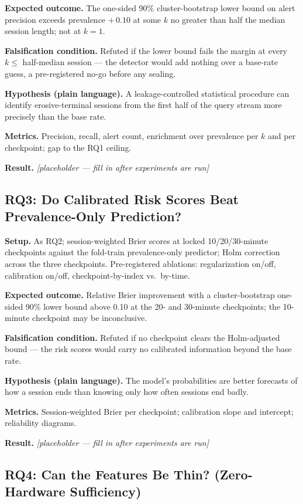\documentclass[11pt]{article}
\begin{document}
\textbf{Expected outcome.} The one-sided 90\% cluster-bootstrap lower bound on alert precision exceeds prevalence $+\,0.10$ at some $k$ no greater than half the median session length; not at $k = 1$.

\textbf{Falsification condition.} Refuted if the lower bound fails the margin at every $k \leq$ half-median session --- the detector would add nothing over a base-rate guess, a pre-registered no-go before any sealing.

\textbf{Hypothesis (plain language).} A leakage-controlled statistical procedure can identify erosive-terminal sessions from the first half of the query stream more precisely than the base rate.

\textbf{Metrics.} Precision, recall, alert count, enrichment over prevalence per $k$ and per checkpoint; gap to the RQ1 ceiling.

\textbf{Result.} \emph{[placeholder --- fill in after experiments are run]}

\subsection{RQ3: Do Calibrated Risk Scores Beat Prevalence-Only Prediction?}

\textbf{Setup.} As RQ2; session-weighted Brier scores at locked 10/20/30-minute checkpoints against the fold-train prevalence-only predictor; Holm correction \citep{holm1979simple} across the three checkpoints. Pre-registered ablations: regularization on/off, calibration on/off, checkpoint-by-index vs.\ by-time.

\textbf{Expected outcome.} Relative Brier improvement with a cluster-bootstrap one-sided 90\% lower bound above 0.10 at the 20- and 30-minute checkpoints; the 10-minute checkpoint may be inconclusive.

\textbf{Falsification condition.} Refuted if no checkpoint clears the Holm-adjusted bound --- the risk scores would carry no calibrated information beyond the base rate.

\textbf{Hypothesis (plain language).} The model's probabilities are better forecasts of how a session ends than knowing only how often sessions end badly.

\textbf{Metrics.} Session-weighted Brier per checkpoint; calibration slope and intercept; reliability diagrams.

\textbf{Result.} \emph{[placeholder --- fill in after experiments are run]}

\subsection{RQ4: Can the Features Be Thin? (Zero-Hardware Sufficiency)}
\end{document}
